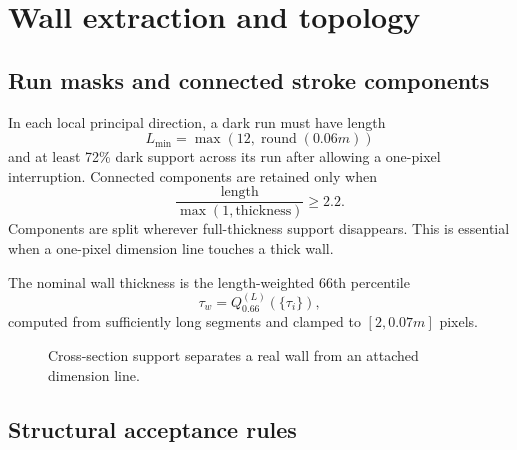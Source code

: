 \documentclass[11pt,a4paper]{article}
\begin{document}
\section{Wall extraction and topology}

\subsection{Run masks and connected stroke components}

In each local principal direction, a dark run must have length
\begin{equation}
L_{\min}=\max(12,\operatorname{round}(0.06m))
\end{equation}
and at least 72\% dark support across its run after allowing a one-pixel interruption. Connected components are retained only when
\begin{equation}
\frac{\text{length}}{\max(1,\text{thickness})}\geq2.2.
\end{equation}
Components are split wherever full-thickness support disappears. This is essential when a one-pixel dimension line touches a thick wall.

The nominal wall thickness is the length-weighted 66th percentile
\begin{equation}
\tau_w=Q^{(L)}_{0.66}\left(\{\tau_i\}\right),
\end{equation}
computed from sufficiently long segments and clamped to $[2,0.07m]$ pixels.

\begin{figure}[htbp]
\centering
{}
\caption{Cross-section support separates a real wall from an attached dimension line.}
\label{fig:falsewall}
\end{figure}

\subsection{Structural acceptance rules}
\end{document}
